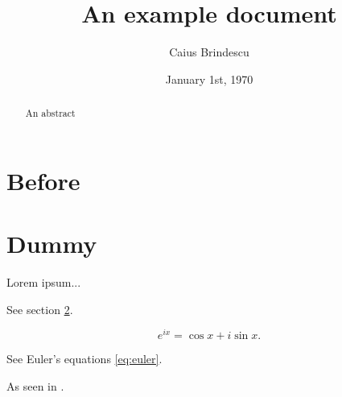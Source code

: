 \documentclass{article}
\title{An example document}
\author{Caius Brindescu}
\date{January 1st, 1970}
\begin{document}
\maketitle

\begin{abstract}
An abstract
\end{abstract}

\section{Before}

\section{Dummy}
\label{sec:dummy}
Lorem ipsum...

See section \ref{sec:dummy}.

\begin{equation}
e^{ix} = \cos{x} + i \sin{x}.
\label{eq:euler}
\end{equation}

See Euler's equations \ref{eq:euler}.

As seen in \cite{knuth1992literate}.



\end{document}
